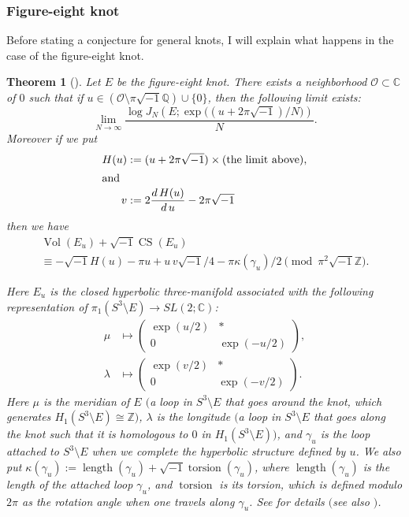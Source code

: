 \documentclass{amsart}
\newcommand{\Z}{\mathbb{Z}}
\newcommand{\C}{\mathbb{C}}
\newcommand{\Q}{\mathbb{Q}}
\newcommand{\Vol}{\operatorname{Vol}}
\newcommand{\CS}{\operatorname{CS}}
\newcommand{\length}{\operatorname{length}}
\newcommand{\torsion}{\operatorname{torsion}}
\newtheorem{theorem}{Theorem}[section]
\theoremstyle{definition}
\theoremstyle{remark}
\numberwithin{equation}{section}
\begin{document}
\subsubsection{Figure-eight knot}
Before stating a conjecture for general knots, I will explain what happens in the case of the figure-eight knot.
\begin{theorem}[\cite{Murakami/Yokota:JREIA2007}]\label{thm:MY}
Let $E$ be the figure-eight knot.
There exists a neighborhood $\mathcal{O}\subset\C$ of $0$ such that if $u\in(\mathcal{O}\setminus\pi\sqrt{-1}\Q)\cup\{0\}$, then the following limit exists:
\begin{equation*}
  \lim_{N\to\infty}
  \frac{\log J_N(E;\exp\bigl((u+2\pi\sqrt{-1})/N\bigr))}{N}.
\end{equation*}
Moreover if we put
\begin{align*}
  H(u)
  &:=
  (u+2\pi\sqrt{-1})\times(\text{the limit above}),
  \\
  \intertext{and}
  v
  &:=
  2\dfrac{d\,H(u)}{d\,u}-2\pi\sqrt{-1}
\end{align*}
then we have
\begin{multline*}
  \Vol(E_{u})+\sqrt{-1}\CS(E_{u})
  \\
  \equiv
  -\sqrt{-1}H(u)
  -\pi{u}
  +u\,v\sqrt{-1}/4
  -\pi\kappa(\gamma_u)/2
  \pmod{\pi^2\sqrt{-1}\Z}.
\end{multline*}
\par
Here $E_{u}$ is the closed hyperbolic three-manifold associated with the following representation of $\pi_1\left(S^3\setminus{E}\right)\to SL(2;\C)$:
\begin{equation}\label{eq:meridian_longitude}
\begin{split}
  \mu
  &\mapsto
  \begin{pmatrix}\exp(u/2)&\ast\\0&\exp(-u/2)\end{pmatrix},
  \\[5mm]
  \lambda
  &\mapsto
  \begin{pmatrix}\exp(v/2)&\ast\\0&\exp(-v/2)\end{pmatrix}.
\end{split}
\end{equation}
Here $\mu$ is the meridian of $E$ $($a loop in $S^3\setminus{E}$ that goes around the knot, which generates $H_1(S^3\setminus{E})\cong\Z$$)$, $\lambda$ is the longitude $($a loop in $S^3\setminus{E}$ that goes along the knot such that it is homologous to $0$ in $H_1(S^3\setminus{E})$$)$, and $\gamma_u$ is the loop attached to $S^3\setminus{E}$ when we complete the hyperbolic structure defined by $u$.
We also put $\kappa(\gamma_{u}):=\length(\gamma_u)+\sqrt{-1}\torsion(\gamma_u)$, where $\length(\gamma_u)$ is the length of the attached loop $\gamma_u$, and $\torsion$ is its torsion, which is defined modulo $2\pi$ as the rotation angle when one travels along $\gamma_u$.
See \cite{Neumann/Zagier:TOPOL85} for details $($see also \cite{Murakami:FUNDM2004}$)$.
\end{theorem}
\end{document}
